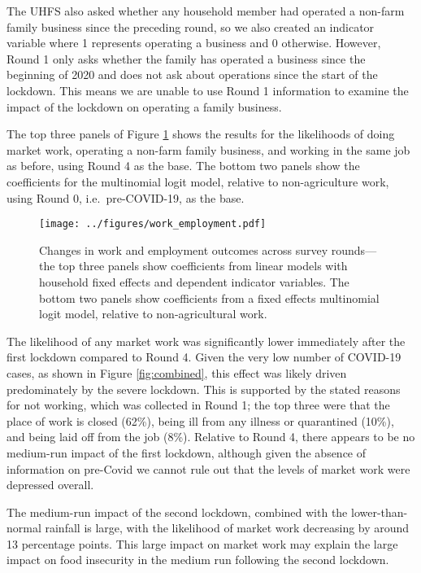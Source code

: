\documentclass{wber}
\begin{document}
The UHFS also asked whether any household member had operated a non-farm
family business since the preceding round, so we also created an
indicator variable where 1 represents operating a business and 0
otherwise. However, Round 1 only asks whether the family has operated a
business since the beginning of 2020 and does not ask about operations
since the start of the lockdown. This means we are unable to use Round 1
information to examine the impact of the lockdown on operating a family
business.

The top three panels of Figure \ref{fig:work_employment} shows the results
for the likelihoods of doing market work, operating a non-farm family
business, and working in the same job as before, using Round 4 as the
base. The bottom two panels show the coefficients for the multinomial
logit model, relative to non-agriculture work, using Round 0,
i.e.\ pre-COVID-19, as the base.

\begin{figure}
\centering
\texttt{[image: ../figures/work\_employment.pdf]}
\caption{Changes in work and employment outcomes across survey rounds---the top 
three panels show coefficients from linear models with household
fixed effects and dependent indicator variables. The bottom two panels
show coefficients from a fixed effects multinomial logit model, relative
to non-agricultural work.}\label{fig:work_employment}
\end{figure}

The likelihood of any market work was significantly lower immediately
after the first lockdown compared to Round 4. Given the very low number
of COVID-19 cases, as shown in Figure \ref{fig:combined}, this effect was
likely driven predominately by the severe lockdown. This is supported by
the stated reasons for not working, which was collected in Round 1; the
top three were that the place of work is closed (62\%), being ill from
any illness or quarantined (10\%), and being laid off from the job
(8\%). Relative to Round 4, there appears to be no medium-run impact of
the first lockdown, although given the absence of information on
pre-Covid we cannot rule out that the levels of market work were
depressed overall.

The medium-run impact of the second lockdown, combined with the
lower-than-normal rainfall is large, with the likelihood of market work
decreasing by around 13 percentage points. This large impact on market
work may explain the large impact on food insecurity in the medium run
following the second lockdown.
\end{document}
